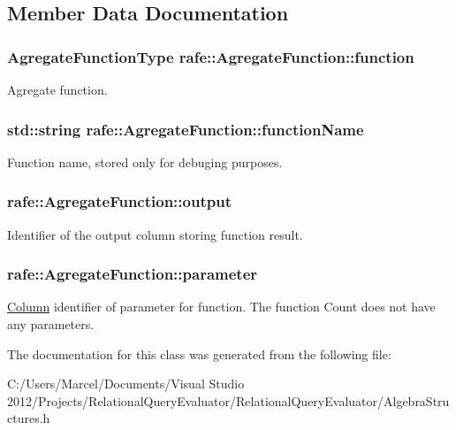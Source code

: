 \subsection{Member Data Documentation}
\hypertarget{classrafe_1_1_agregate_function_a9055ffba2605e99d0ca5362b9b5c7437}{
\subsubsection[{function}]{\setlength{\rightskip}{0pt plus 5cm}Agregate\+Function\+Type rafe\+::\+Agregate\+Function\+::function}}\label{classrafe_1_1_agregate_function_a9055ffba2605e99d0ca5362b9b5c7437}
Agregate function. \hypertarget{classrafe_1_1_agregate_function_a0b3dc806bca42c5ce5525441025166f0}{
\subsubsection[{function\+Name}]{\setlength{\rightskip}{0pt plus 5cm}std\+::string rafe\+::\+Agregate\+Function\+::function\+Name}}\label{classrafe_1_1_agregate_function_a0b3dc806bca42c5ce5525441025166f0}
Function name, stored only for debuging purposes. \hypertarget{classrafe_1_1_agregate_function_ad01da78516417600b5fa40418a5d2cb6}{
\subsubsection[{output}]{ rafe\+::\+Agregate\+Function\+::output}}\label{classrafe_1_1_agregate_function_ad01da78516417600b5fa40418a5d2cb6}
Identifier of the output column storing function result. \hypertarget{classrafe_1_1_agregate_function_ab7cc5507a807035e2a35fbba2fc650d6}{
\subsubsection[{parameter}]{ rafe\+::\+Agregate\+Function\+::parameter}}\label{classrafe_1_1_agregate_function_ab7cc5507a807035e2a35fbba2fc650d6}
\hyperlink{classrafe_1_1_column}{Column} identifier of parameter for function. The function Count does not have any parameters. 

The documentation for this class was generated from the following file\+:\begin{DoxyCompactItemize}
\item 
C\+:/\+Users/\+Marcel/\+Documents/\+Visual Studio 2012/\+Projects/\+Relational\+Query\+Evaluator/\+Relational\+Query\+Evaluator/Algebra\+Structures.\+h\end{DoxyCompactItemize}
